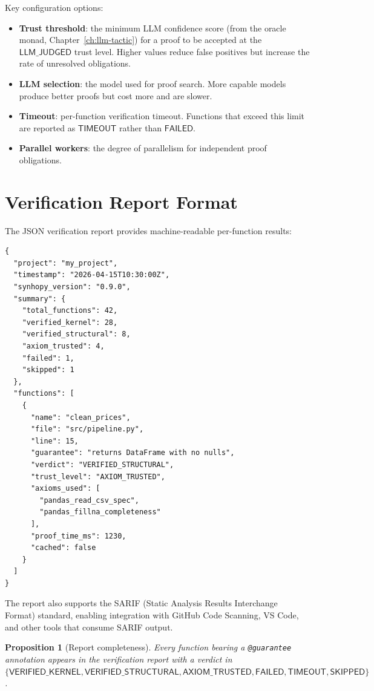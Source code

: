 \documentclass[11pt,a4paper]{report}
\theoremstyle{definition}
\theoremstyle{plain}
\newtheorem{proposition}[definition]{Proposition}
\begin{document}
Key configuration options:
\begin{itemize}
  \item \textbf{Trust threshold}: the minimum LLM confidence score (from
    the oracle monad, Chapter~\ref{ch:llm-tactic}) for a proof to be accepted
    at the $\mathsf{LLM\_JUDGED}$ trust level.  Higher values reduce false
    positives but increase the rate of unresolved obligations.
  \item \textbf{LLM selection}: the model used for proof search.  More capable
    models produce better proofs but cost more and are slower.
  \item \textbf{Timeout}: per-function verification timeout.  Functions that
    exceed this limit are reported as $\mathsf{TIMEOUT}$ rather than
    $\mathsf{FAILED}$.
  \item \textbf{Parallel workers}: the degree of parallelism for independent
    proof obligations.
\end{itemize}

\section{Verification Report Format}

The JSON verification report provides machine-readable per-function results:

\begin{lstlisting}[style=python]
{
  "project": "my_project",
  "timestamp": "2026-04-15T10:30:00Z",
  "synhopy_version": "0.9.0",
  "summary": {
    "total_functions": 42,
    "verified_kernel": 28,
    "verified_structural": 8,
    "axiom_trusted": 4,
    "failed": 1,
    "skipped": 1
  },
  "functions": [
    {
      "name": "clean_prices",
      "file": "src/pipeline.py",
      "line": 15,
      "guarantee": "returns DataFrame with no nulls",
      "verdict": "VERIFIED_STRUCTURAL",
      "trust_level": "AXIOM_TRUSTED",
      "axioms_used": [
        "pandas_read_csv_spec",
        "pandas_fillna_completeness"
      ],
      "proof_time_ms": 1230,
      "cached": false
    }
  ]
}
\end{lstlisting}

The report also supports the SARIF (Static Analysis Results Interchange
Format) standard, enabling integration with GitHub Code Scanning, VS Code,
and other tools that consume SARIF output.

\begin{proposition}[Report completeness]
Every function bearing a \lstinline[style=synhopy]{@guarantee} annotation
appears in the verification report with a verdict in
$\{\mathsf{VERIFIED\_KERNEL}, \mathsf{VERIFIED\_STRUCTURAL},
\mathsf{AXIOM\_TRUSTED}, \mathsf{FAILED}, \mathsf{TIMEOUT},
\mathsf{SKIPPED}\}$.
\end{proposition}
\end{document}
